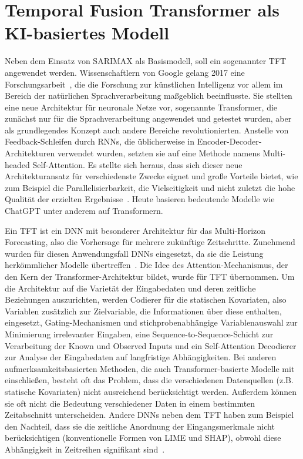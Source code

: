 \section{Temporal Fusion Transformer als KI-basiertes Modell}
Neben dem Einsatz von SARIMAX als Basismodell, soll ein sogenannter \ac{TFT} angewendet werden.
Wissenschaftlern von Google gelang 2017 eine Forschungsarbeit~\cite{Vaswani.2017}, die die Forschung zur künstlichen Intelligenz vor allem im Bereich der natürlichen Sprachverarbeitung maßgeblich beeinflusste.
Sie stellten eine neue Architektur für neuronale Netze vor, sogenannte Transformer, die zunächst nur für die Sprachverarbeitung angewendet und getestet wurden, aber als grundlegendes Konzept auch andere Bereiche revolutionierten.
Anstelle von Feedback-Schleifen durch \ac{RNN}s, die üblicherweise in Encoder-Decoder-Architekturen verwendet wurden, setzten sie auf eine Methode namens \glqq Multi-headed Self-Attention\grqq{}.
Es stellte sich heraus, dass sich dieser neue Architekturansatz für verschiedenste Zwecke eignet und große Vorteile bietet, wie zum Beispiel die Parallelisierbarkeit, die Vielseitigkeit und nicht zuletzt die hohe Qualität der erzielten Ergebnisse~\cite{Vaswani.2017}.
Heute basieren bedeutende Modelle wie ChatGPT unter anderem auf Transformern.

Ein \ac{TFT} ist ein \ac{DNN} mit besonderer Architektur für das Multi-Horizon Forecasting, also die Vorhersage für mehrere zukünftige Zeitschritte.
Zunehmend wurden für diesen Anwendungsfall \ac{DNN}s eingesetzt, da sie die Leistung herkömmlicher Modelle übertreffen~\cite{Lim.19.12.2019}.
Die Idee des Attention-Mechanismus, der den Kern der Transformer-Architektur bildet, wurde für \ac{TFT} übernommen.
Um die Architektur auf die Varietät der Eingabedaten und deren zeitliche Beziehungen auszurichten, werden Codierer für die statischen Kovariaten, also Variablen zusätzlich zur Zielvariable, die Informationen über diese enthalten, eingesetzt, Gating-Mechanismen und stichprobenabhängige Variablenauswahl zur Minimierung irrelevanter Eingaben, eine Sequence-to-Sequence-Schicht zur Verarbeitung der Known und Observed Inputs und ein Self-Attention Decodierer zur Analyse der Eingabedaten auf langfristige Abhängigkeiten.
Bei anderen aufmerksamkeitsbasierten Methoden, die auch Transformer-basierte Modelle mit einschließen, besteht oft das Problem, dass die verschiedenen Datenquellen (z.B. statische Kovariaten) nicht ausreichend berücksichtigt werden.
Außerdem können sie oft nicht die Bedeutung verschiedener Daten in einem bestimmten Zeitabschnitt unterscheiden.
Andere \ac{DNN}s neben dem \ac{TFT} haben zum Beispiel den Nachteil, dass sie die zeitliche Anordnung der Eingangsmerkmale nicht berücksichtigen (konventionelle Formen von LIME und SHAP), obwohl diese Abhängigkeit in Zeitreihen signifikant sind~\cite{Lim.19.12.2019}.

